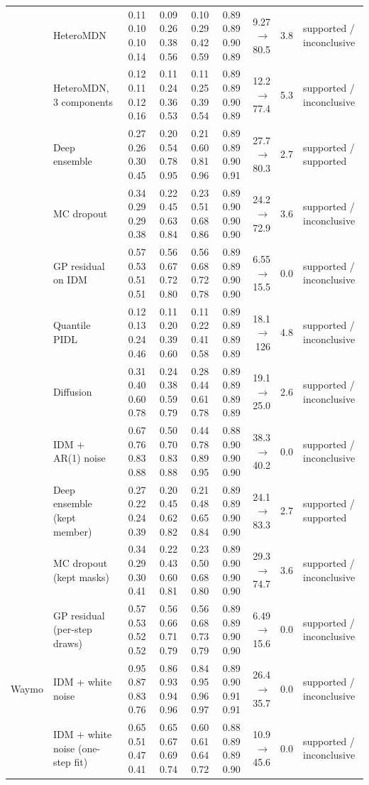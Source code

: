 \begin{longtable}{llrrrrrrl}
 & HeteroMDN & 0.11 0.10 0.10 0.14 & 0.09 0.26 0.38 0.56 & 0.10 0.29 0.42 0.59 & 0.89 0.89 0.90 0.89 & 9.27 $\rightarrow$ 80.5 & 3.8 & supported / inconclusive \\
 & HeteroMDN, 3 components & 0.12 0.11 0.12 0.16 & 0.11 0.24 0.36 0.53 & 0.11 0.25 0.39 0.54 & 0.89 0.89 0.90 0.89 & 12.2 $\rightarrow$ 77.4 & 5.3 & supported / inconclusive \\
 & Deep ensemble & 0.27 0.26 0.30 0.45 & 0.20 0.54 0.78 0.95 & 0.21 0.60 0.81 0.96 & 0.89 0.89 0.90 0.91 & 27.7 $\rightarrow$ 80.3 & 2.7 & supported / supported \\
 & MC dropout & 0.34 0.29 0.29 0.38 & 0.22 0.45 0.63 0.84 & 0.23 0.51 0.68 0.86 & 0.89 0.90 0.90 0.90 & 24.2 $\rightarrow$ 72.9 & 3.6 & supported / inconclusive \\
 & GP residual on IDM & 0.57 0.53 0.51 0.51 & 0.56 0.67 0.72 0.80 & 0.56 0.68 0.72 0.78 & 0.89 0.89 0.90 0.90 & 6.55 $\rightarrow$ 15.5 & 0.0 & supported / inconclusive \\
 & Quantile PIDL & 0.12 0.13 0.24 0.46 & 0.11 0.20 0.39 0.60 & 0.11 0.22 0.41 0.58 & 0.89 0.89 0.89 0.89 & 18.1 $\rightarrow$ 126 & 4.8 & supported / inconclusive \\
 & Diffusion & 0.31 0.40 0.60 0.78 & 0.24 0.38 0.59 0.79 & 0.28 0.44 0.61 0.78 & 0.89 0.89 0.89 0.89 & 19.1 $\rightarrow$ 25.0 & 2.6 & supported / inconclusive \\
 & IDM + AR(1) noise & 0.67 0.76 0.83 0.88 & 0.50 0.70 0.83 0.88 & 0.44 0.78 0.89 0.95 & 0.88 0.90 0.90 0.90 & 38.3 $\rightarrow$ 40.2 & 0.0 & supported / inconclusive \\
 & Deep ensemble (kept member) & 0.27 0.22 0.24 0.39 & 0.20 0.45 0.62 0.82 & 0.21 0.48 0.65 0.84 & 0.89 0.89 0.90 0.90 & 24.1 $\rightarrow$ 83.3 & 2.7 & supported / supported \\
 & MC dropout (kept masks) & 0.34 0.29 0.30 0.41 & 0.22 0.43 0.60 0.81 & 0.23 0.50 0.68 0.80 & 0.89 0.90 0.90 0.90 & 29.3 $\rightarrow$ 74.7 & 3.6 & supported / inconclusive \\
 & GP residual (per-step draws) & 0.57 0.53 0.52 0.52 & 0.56 0.66 0.71 0.79 & 0.56 0.68 0.73 0.79 & 0.89 0.89 0.90 0.90 & 6.49 $\rightarrow$ 15.6 & 0.0 & supported / inconclusive \\
\midrule
Waymo & IDM + white noise & 0.95 0.87 0.83 0.76 & 0.86 0.93 0.94 0.96 & 0.84 0.95 0.96 0.97 & 0.89 0.90 0.91 0.91 & 26.4 $\rightarrow$ 35.7 & 0.0 & supported / inconclusive \\
 & IDM + white noise (one-step fit) & 0.65 0.51 0.47 0.41 & 0.65 0.67 0.69 0.74 & 0.60 0.61 0.64 0.72 & 0.88 0.89 0.89 0.90 & 10.9 $\rightarrow$ 45.6 & 0.0 & supported / inconclusive \\

\end{longtable}
